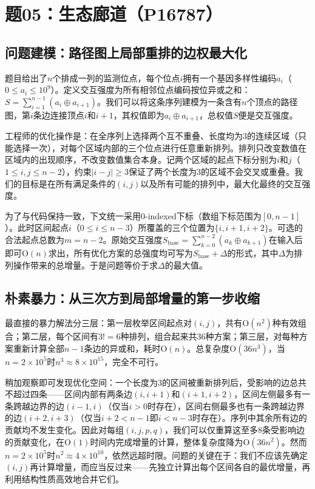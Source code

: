\section{题05：生态廊道（P16787）}

\subsection{问题建模：路径图上局部重排的边权最大化}

题目给出了$n$个排成一列的监测位点，每个位点$i$拥有一个基因多样性编码$a_i$（$0\le a_i\le 10^9$）。定义交互强度为所有相邻位点编码按位异或之和：$S=\sum_{i=1}^{n-1}(a_i\oplus a_{i+1})$。我们可以将这条序列建模为一条含有$n$个顶点的路径图，第$i$条边连接顶点$i$和$i+1$，其权值即为$a_i\oplus a_{i+1}$，总权值$S$便是交互强度。

工程师的优化操作是：在全序列上选择两个互不重叠、长度均为$3$的连续区域（只能选择一次），对每个区域内部的三个位点进行任意重新排列。排列只改变数值在区域内的出现顺序，不改变数值集合本身。记两个区域的起点下标分别为$i$和$j$（$1\le i,j\le n-2$），约束$|i-j|\ge 3$保证了两个长度为$3$的区域不会交叉或重叠。我们的目标是在所有满足条件的$(i,j)$以及所有可能的排列中，最大化最终的交互强度。

为了与代码保持一致，下文统一采用0-indexed下标（数组下标范围为$[0,n-1]$）。此时区间起点$i$（$0\le i\le n-3$）所覆盖的三个位置为$\{i,i+1,i+2\}$。可选的合法起点总数为$m=n-2$。原始交互强度$S_{\text{base}}=\sum_{k=0}^{n-2}(a_k\oplus a_{k+1})$在输入后即可$\mathrm{O}(n)$求出，所有优化方案的总强度均可写为$S_{\text{base}}+\Delta$的形式，其中$\Delta$为排列操作带来的总增量。于是问题等价于求$\Delta$的最大值。

\subsection{朴素暴力：从三次方到局部增量的第一步收缩}

最直接的暴力解法分三层：第一层枚举区间起点对$(i,j)$，共有$\mathrm{O}(n^2)$种有效组合；第二层，每个区间有$3!=6$种排列，组合起来共$36$种方案；第三层，对每种方案重新计算全部$n-1$条边的异或和，耗时$\mathrm{O}(n)$。总复杂度$\mathrm{O}(36n^3)$，当$n=2\times10^5$时$n^3\approx8\times10^{15}$，完全不可行。

稍加观察即可发现优化空间：一个长度为$3$的区间被重新排列后，受影响的边总共不超过四条——区间内部有两条边$(i,i+1)$和$(i+1,i+2)$，区间左侧最多有一条跨越边界的边$(i-1,i)$（仅当$i>0$时存在），区间右侧最多也有一条跨越边界的边$(i+2,i+3)$（仅当$i+2<n-1$即$i<n-3$时存在）。序列中其余所有边的贡献均不发生变化。因此对每组$(i,j,p,q)$，我们可以仅重算这至多$8$条受影响边的贡献变化，在$\mathrm{O}(1)$时间内完成增量的计算，整体复杂度降为$\mathrm{O}(36n^2)$。然而$n=2\times10^5$时$n^2\approx4\times10^{10}$，依然远超时限。问题的关键在于：我们不应该先确定$(i,j)$再计算增量，而应当反过来——先独立计算出每个区间各自的最优增量，再利用结构性质高效地合并它们。

